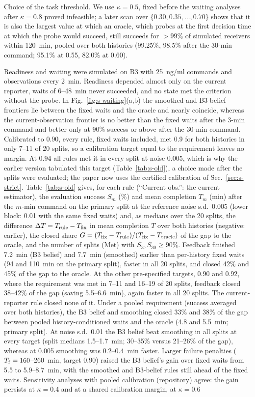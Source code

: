 \documentclass[conference]{IEEEtran}
\begin{document}
Choice of the task threshold. We use $\kappa=0.5$, fixed before the waiting analyses after $\kappa=0.8$ proved infeasible; a later scan over $\{0.30,0.35,\ldots,0.70\}$ shows that it is also the largest value at which an oracle, which probes at the first decision time at which the probe would succeed, still succeeds for $>99\%$ of simulated receivers within 120~min, pooled over both histories (99.25\%, 98.5\% after the 30-min command; 95.1\% at 0.55, 82.0\% at 0.60).

Readiness and waiting were simulated on B3 with 25~ng/ml commands and observations every 2~min. Readiness depended almost only on the current reporter, waits of 6--48~min never succeeded, and no state met the criterion without the probe. In Fig.~\ref{fig:s-waiting}(a,b) the smoothed and B3-belief frontiers lie between the fixed waits and the oracle and nearly coincide, whereas the current-observation frontier is no better than the fixed waits after the 3-min command and better only at 90\% success or above after the 30-min command. Calibrated to 0.90, every rule, fixed waits included, met 0.9 for both histories in only 7--11 of 20 splits, so a calibration target equal to the requirement leaves no margin. At 0.94 all rules met it in every split at noise 0.005, which is why the earlier version tabulated this target (Table~\ref{tab:s-old}), a choice made after the splits were evaluated; the paper now uses the certified calibration of Sec.~\ref{sec:s-strict}. Table~\ref{tab:s-old} gives, for each rule (``Current obs.'': the current estimator), the evaluation success $S_m$ (\%) and mean completion $T_m$ (min) after the $m$-min command on the primary split at the reference noise s.d.\ 0.005 (lower block: 0.01 with the same fixed waits) and, as medians over the 20 splits, the difference $\Delta T=T_{\rm rule}-T_{\rm fix}$ in mean completion $T$ over both histories (negative: earlier), the closed share $G=(T_{\rm fix}-T_{\rm rule})/(T_{\rm fix}-T_{\rm oracle})$ of the gap to the oracle, and the number of splits (Met) with $S_3,S_{30}\geq90\%$. Feedback finished 7.2~min (B3 belief) and 7.7~min (smoothed) earlier than per-history fixed waits (94 and 110~min on the primary split), faster in all 20 splits, and closed 42\% and 45\% of the gap to the oracle. At the other pre-specified targets, 0.90 and 0.92, where the requirement was met in 7--11 and 16--19 of 20 splits, feedback closed 38--42\% of the gap (saving 5.5--6.6~min), again faster in all 20 splits. The current-reporter rule closed none of it. Under a pooled requirement (success averaged over both histories), the B3 belief and smoothing closed 33\% and 38\% of the gap between pooled history-conditioned waits and the oracle (4.8 and 5.5~min; primary split). At noise s.d.\ 0.01 the B3 belief beat smoothing in all splits at every target (split medians 1.5--1.7~min; 30--35\% versus 21--26\% of the gap), whereas at 0.005 smoothing was 0.2--0.4~min faster. Larger failure penalties ($T_{\rm f}=160$--260~min, target 0.90) raised the B3 belief's gain over fixed waits from 5.5 to 5.9--8.7~min, with the smoothed and B3-belief rules still ahead of the fixed waits. Sensitivity analyses with pooled calibration (repository) agree: the gain persists at $\kappa=0.4$ and at a shared calibration margin, at $\kappa=0.6$ 
\end{document}
